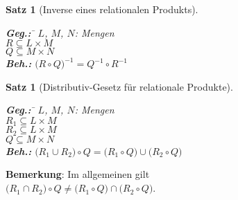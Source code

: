 \documentclass{article}
\newtheorem{Satz}[Definition]{Satz}
\begin{document}
\begin{Satz}[Inverse eines relationalen Produkts] \hspace*{\fill} \\[-0.5cm]
  \begin{tabbing}
    \textbf{Geg.:} \quad \= $L$, $M$, $N$: Mengen \\[0.1cm]
                  \> $R \subseteq L \times M$  \\[0.1cm]
                  \> $Q \subseteq M \times N$  \\[0.1cm]
    \textbf{Beh.:} \> $\bigl(R \circ Q\bigr)^{-1}  = Q^{-1} \circ R^{-1}$
  \end{tabbing}
\end{Satz}

\begin{Satz}[Distributiv-Gesetz f\"{u}r relationale Produkte] \hspace*{\fill} \\[-0.5cm]
  \begin{tabbing}
    \textbf{Geg.:} \quad \= $L$, $M$, $N$: Mengen \\[0.1cm]
                   \> $R_1 \subseteq L \times M$  \\[0.1cm]
                   \> $R_2 \subseteq L \times M$  \\[0.1cm]
                   \> $Q \subseteq M \times N$  \\[0.1cm]
    \textbf{Beh.:} \> $\bigl(R_1 \cup R_2\bigr) \circ Q  = \bigl(R_1 \circ Q\bigr) \cup \bigl(R_2 \circ Q\bigr)$
  \end{tabbing}
\end{Satz}

\noindent
\textbf{Bemerkung}: Im allgemeinen gilt 
\\[0.1cm]
\hspace*{1.3cm}  $\bigl(R_1 \cap R_2\bigr) \circ Q \not= \bigl(R_1 \circ Q\bigr) \cap \bigl(R_2 \circ Q\bigr)$.
\end{document}
